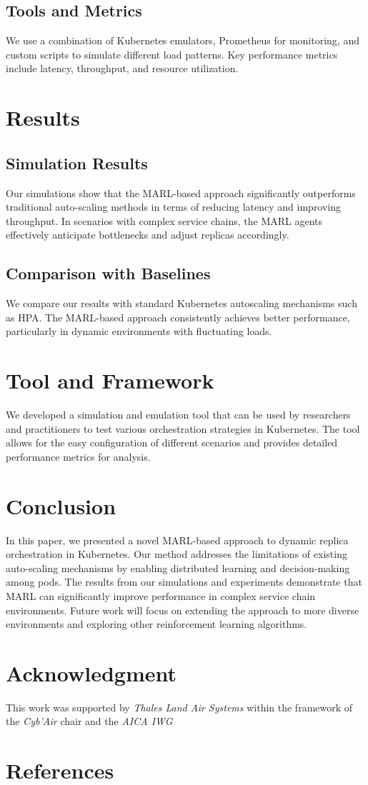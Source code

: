 \documentclass[conference]{IEEEtran}
\begin{document}
\subsection{Tools and Metrics}
We use a combination of Kubernetes emulators, Prometheus for monitoring, and custom scripts to simulate different load patterns. Key performance metrics include latency, throughput, and resource utilization.

\section{Results}
\subsection{Simulation Results}
Our simulations show that the MARL-based approach significantly outperforms traditional auto-scaling methods in terms of reducing latency and improving throughput. In scenarios with complex service chains, the MARL agents effectively anticipate bottlenecks and adjust replicas accordingly.

\subsection{Comparison with Baselines}
We compare our results with standard Kubernetes autoscaling mechanisms such as HPA. The MARL-based approach consistently achieves better performance, particularly in dynamic environments with fluctuating loads.

\section{Tool and Framework}
We developed a simulation and emulation tool that can be used by researchers and practitioners to test various orchestration strategies in Kubernetes. The tool allows for the easy configuration of different scenarios and provides detailed performance metrics for analysis.

\section{Conclusion}
In this paper, we presented a novel MARL-based approach to dynamic replica orchestration in Kubernetes. Our method addresses the limitations of existing auto-scaling mechanisms by enabling distributed learning and decision-making among pods. The results from our simulations and experiments demonstrate that MARL can significantly improve performance in complex service chain environments. Future work will focus on extending the approach to more diverse environments and exploring other reinforcement learning algorithms.

\section*{Acknowledgment}

This work was supported by \emph{Thales Land Air Systems} within the framework of the \emph{Cyb'Air} chair and the \emph{AICA IWG}

\section*{References}

% 



\end{document}
